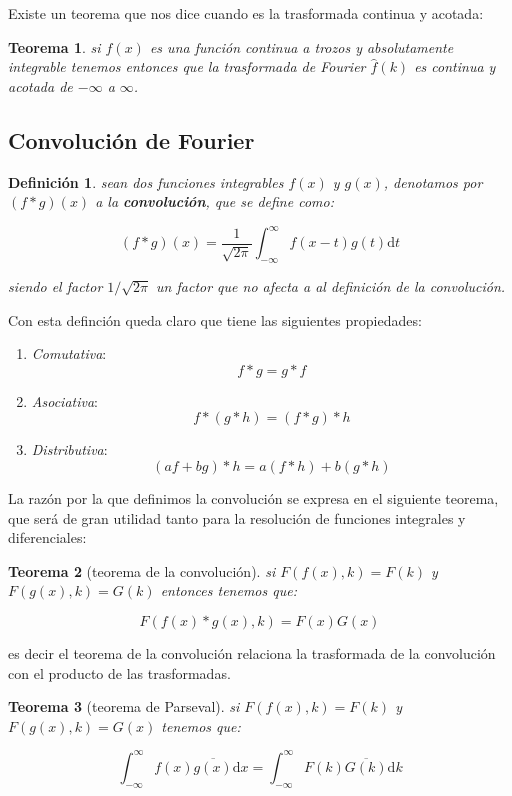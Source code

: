 \documentclass[12pt,a4paper]{book}
\newcommand{\D}{\mathrm{d}}
\newcommand{\inti}{\int_{-\infty}^{\infty}}
\newcommand{\hatf}{\widehat{f}}
\newtheorem{theorem}{Teorema}[section]
\newtheorem{definicion}{Definición}[section]
\begin{document}
Existe un teorema que nos dice cuando es la trasformada continua y acotada:

\begin{theorem}
si $f(x)$ es una función continua a trozos y absolutamente integrable tenemos entonces que la trasformada de Fourier $\hatf (k)$ es continua y acotada de $-\infty$ a $\infty$.
\end{theorem}

\subsection{Convolución de Fourier}


\begin{definicion}
sean dos funciones integrables $f(x)$ y $g(x)$, denotamos por $(f * g)(x)$ a la \textbf{convolución}, que se define como:

\begin{equation}
(f * g)(x) = \dfrac{1}{\sqrt{2 \pi}} \int_{-\infty}^{\infty}  f(x-t) g(t) \D t
\end{equation}

siendo el factor $1/\sqrt{2 \pi}$ un factor que no afecta a al definición de la convolución.
\end{definicion}


Con esta definción queda claro que tiene las siguientes propiedades:

\begin{enumerate}
\item \textit{Comutativa}: $$ f * g = g * f $$
\item \textit{Asociativa}: $$ f * (g * h) = (f * g) * h $$
\item \textit{Distributiva}: $$ (a f + b g) * h = a (f * h) + b (g * h) $$
\end{enumerate}

La razón por la que definimos la convolución se expresa en el siguiente teorema, que será de gran utilidad tanto para la resolución de funciones integrales y diferenciales:

\begin{theorem}[teorema de la convolución]
si $F(f(x),k) = F(k)$ y $F(g(x),k) = G(k)$ entonces tenemos que:

$$ F(f(x) * g(x) , k) = F(x) G(x) $$
\end{theorem}

es decir el teorema de la convolución relaciona la trasformada de la convolución con el producto de las trasformadas. 


\begin{theorem}[teorema de Parseval] si $F(f(x),k)  = F(k)$ y $F(g(x),k) = G(x)$ tenemos que:

$$  \inti f(x) \overline{g(x)} \D x   = \inti F(k) \overline{G(k)} \D k  $$
\end{theorem}
\end{document}
